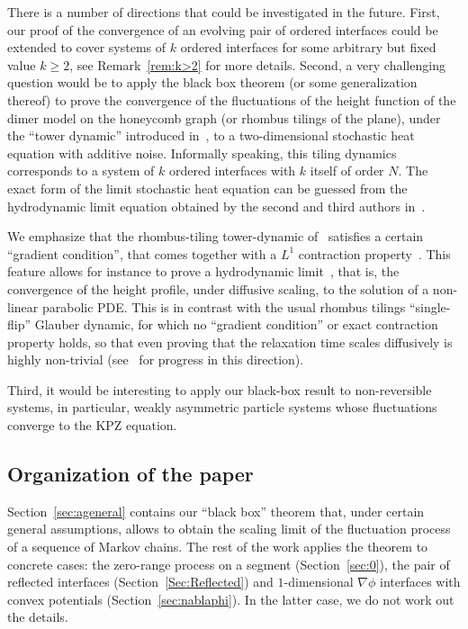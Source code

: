 \documentclass[AHL,Unicode,longabstracts]{cedram}
\theoremstyle{plain}
\begin{document}
There is a number of directions that could be investigated in the future. First, our proof of the convergence of an evolving pair of ordered interfaces could be extended to cover systems of $k$ ordered interfaces for some arbitrary but fixed value $k\ge 2$, see Remark~\ref{rem:k>2} for more details. Second, a very challenging question would be to apply the black box theorem (or some generalization thereof) to prove the convergence of the fluctuations of the height function of the dimer model on the honeycomb graph (or rhombus tilings of the plane), under the ``tower dynamic'' introduced in~\cite{luby2001markov,wilson2004mixing}, to a two-dimensional stochastic heat equation with additive noise. Informally speaking, this tiling dynamics corresponds to a system of $k$ ordered interfaces with $k$ itself of order $N$. The exact form of the limit stochastic heat equation can be guessed from the hydrodynamic limit equation obtained by the second and third authors in~\cite{LT1,LT2}.

We emphasize that the rhombus-tiling tower-dynamic of~\cite{wilson2004mixing} satisfies a certain ``gradient condition'', that comes together with a $L^1$ contraction property~\cite[Section~3]{LT1}. This feature allows for instance to prove a hydrodynamic limit~\cite{LT1,LT2}, that is, the convergence of the height profile, under diffusive scaling, to the solution of a non-linear parabolic PDE. This is in contrast with the usual rhombus tilings ``single-flip'' Glauber dynamic, for which no ``gradient condition'' or exact contraction property holds, so that even proving that the relaxation time scales diffusively is highly non-trivial (see~\cite{CMTcmp,LTahp} for progress in this direction).

Third, it would be interesting to apply our black-box result to non-reversible systems, in particular, weakly asymmetric particle systems whose fluctuations converge to the KPZ equation.



\subsection*{Organization of the paper}

Section~\ref{sec:ageneral} contains our ``black box'' theorem that, under certain general assumptions, allows to obtain the scaling limit of the fluctuation process of a sequence of Markov chains. The rest of the work applies the theorem to concrete cases: the zero-range process on a segment (Section~\ref{sec:0}), the pair of reflected interfaces (Section~\ref{Sec:Reflected}) and $1$-dimensional $\nabla\phi$ interfaces with convex potentials (Section~\ref{sec:nablaphi}). In the latter case, we do not work out the details.
\end{document}
